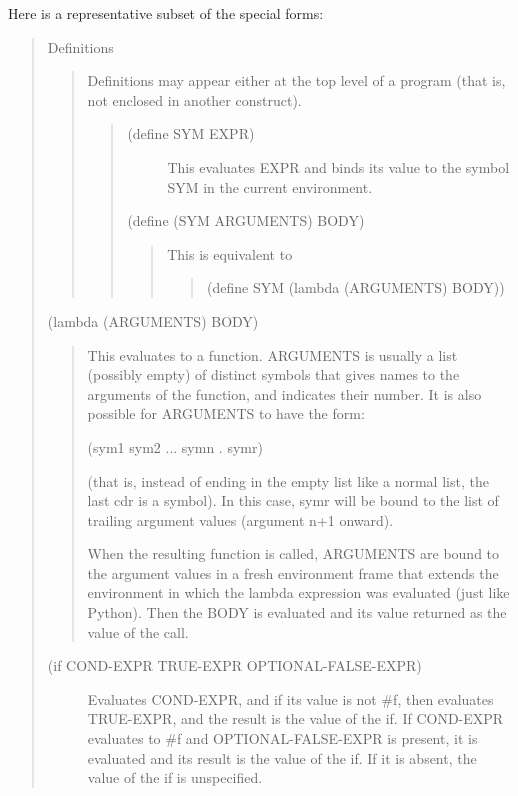 \documentclass[letterpaper,10pt,dvipdfmx]{sphinxmanual}
\begin{document}
Here is a representative subset of the special forms:
\begin{quote}

Definitions
\begin{quote}

Definitions may appear either at the top level of a program (that is, not enclosed in another construct).
\begin{quote}
\begin{description}
\item[{(define SYM EXPR)}] \leavevmode
This evaluates EXPR and binds its value to the symbol SYM in the current environment.

\end{description}

(define (SYM ARGUMENTS) BODY)
\begin{quote}

This is equivalent to
\begin{quote}

(define SYM (lambda (ARGUMENTS) BODY))
\end{quote}
\end{quote}
\end{quote}
\end{quote}

(lambda (ARGUMENTS) BODY)
\begin{quote}

This evaluates to a function. ARGUMENTS is usually a list (possibly empty) of distinct symbols that gives names to the arguments of the function, and indicates their number. It is also possible for ARGUMENTS to have the form:

(sym1 sym2 ... symn . symr)

(that is, instead of ending in the empty list like a normal list, the last cdr is a symbol). In this case, symr will be bound to the list of trailing argument values (argument n+1 onward).

When the resulting function is called, ARGUMENTS are bound to the argument values in a fresh environment frame that extends the environment in which the lambda expression was evaluated (just like Python). Then the BODY is evaluated and its value returned as the value of the call.
\end{quote}
\begin{description}
\item[{(if COND-EXPR TRUE-EXPR OPTIONAL-FALSE-EXPR)}] \leavevmode
Evaluates COND-EXPR, and if its value is not \#f, then evaluates TRUE-EXPR, and the result is the value of the if. If COND-EXPR evaluates to \#f and OPTIONAL-FALSE-EXPR is present, it is evaluated and its result is the value of the if. If it is absent, the value of the if is unspecified.


\end{description}
\end{quote}
\end{document}
